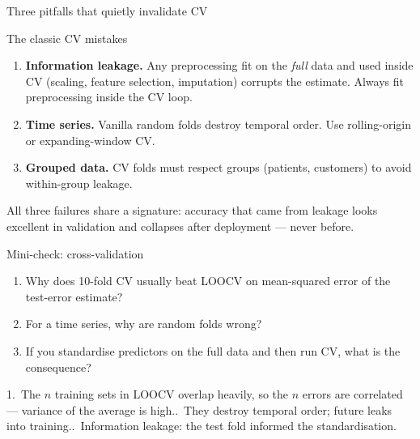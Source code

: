 \documentclass[aspectratio=169,11pt]{beamer}
\begin{document}
\begin{frame}{Three pitfalls that quietly invalidate CV}\label{frm:cvpitfalls}
  \begin{alertblock}{The classic CV mistakes}
    \begin{enumerate}
      \item \textbf{Information leakage.} Any preprocessing fit on the
            \emph{full} data and used inside CV (scaling, feature
            selection, imputation) corrupts the estimate. Always fit
            preprocessing inside the CV loop.
      \item \textbf{Time series.} Vanilla random folds destroy
            temporal order. Use rolling-origin or expanding-window CV.
      \item \textbf{Grouped data.} CV folds must respect groups
            (patients, customers) to avoid within-group leakage.
    \end{enumerate}
  \end{alertblock}
  \begin{takeaway}
    All three failures share a signature: accuracy that came from leakage
    looks excellent in validation and collapses after deployment --- never
    before.
  \end{takeaway}
\end{frame}


\begin{frame}{Mini-check: cross-validation}
  \begin{readme}
    \begin{enumerate}
      \item Why does 10-fold CV usually beat LOOCV on mean-squared error
            of the test-error estimate?
      \item For a time series, why are random folds wrong?
      \item If you standardise predictors on the full data and then run
            CV, what is the consequence?
    \end{enumerate}
  \end{readme}
  \begin{takeaway}[Answers]
    1.\ The $n$ training sets in LOOCV overlap heavily, so the $n$ errors
        are correlated --- variance of the average is high..\ They destroy temporal order; future leaks into training..\ Information leakage: the test fold informed the standardisation.
  \end{takeaway}
\end{frame}
\end{document}
